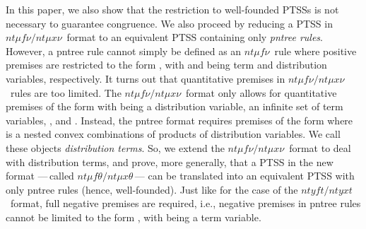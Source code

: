 \documentclass[submission,copyright,creativecommons]{eptcs}
\newcommand{\ntmufnu}{\ensuremath{\textit{nt}\mu\textit{f}\nu}}
\newcommand{\ntmuxnu}{\ensuremath{\textit{nt}\mu\textit{x}\nu}}
\newcommand{\ntmufxnu}{\ensuremath{\ntmufnu\textit{/}\ntmuxnu}}
\newcommand{\ntmuft}{\ensuremath{\textit{nt}\mu\textit{f}\theta}}
\newcommand{\ntmuxt}{\ensuremath{\textit{nt}\mu\textit{x}\theta}}
\newcommand{\ntmufxt}{\ensuremath{\ntmuft\textit{/}\ntmuxt}}
\newcommand{\ntyft}{\ensuremath{\textit{ntyft}}}
\newcommand{\ntyxt}{\ensuremath{\textit{ntyxt}}}
\newcommand{\ntyfxt}{\ensuremath{\ntyft\textit{/}\ntyxt}}
\begin{document}
In this paper, we also show that the restriction to well-founded PTSSs
is not necessary to guarantee congruence. We also proceed by
reducing a PTSS in \ntmufxnu\ format to an equivalent PTSS containing
only \textit{pntree rules}.
However, a pntree rule cannot simply be defined as an \ntmufnu\ rule
where positive premises are restricted to the form ,
with  and  being term and distribution variables, respectively.
It turns out that quantitative premises in \ntmufxnu\ rules are
too limited.  The \ntmufxnu\ format only allows for
quantitative premises of the form  with  being a
distribution variable,  an infinite set of term variables,
, and .
Instead, the pntree format requires premises of the form
 where  is a nested convex combinations of
products of distribution variables.  We call these objects
\emph{distribution terms}.
So, we extend the \ntmufxnu\ format to deal with distribution terms, and prove, more generally, that a
PTSS in the new format ---\,called \ntmufxt\,--- can be translated into an equivalent PTSS
with only pntree rules (hence, well-founded).
Just like for the case of the \ntyfxt\ format, full negative
premises are required, i.e., negative premises in pntree rules cannot
be limited to the form , with  being a term
variable.

\medskip
\end{document}
